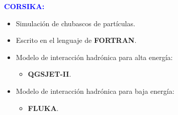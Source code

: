     \begin{frame}{} %
        \justifying %
        \vspace*{-0.1cm} %

        \begin{columns}
            \begin{column}{0.5\textwidth} %
                \textcolor{blue}{\textbf{CORSIKA:}}
                \begin{itemize}
                    \item Simulación de chubascos de partículas.
                    \item Escrito en el lenguaje de \textbf{FORTRAN}.
                    \item Modelo de interacción hadrónica para alta energía:
                        \begin{itemize}
                            \item \textbf{QGSJET-II}.
                        \end{itemize}
                    \item Modelo de interacción hadrónica para baja energía:
                        \begin{itemize}
                            \item \textbf{FLUKA}.
                        \end{itemize}
                \end{itemize}
            \end{column}

            \begin{column}{0.4\textwidth} %
                \begin{figure}
                    
                \end{figure}              
            \end{column}
        \end{columns}
    \end{frame}  



